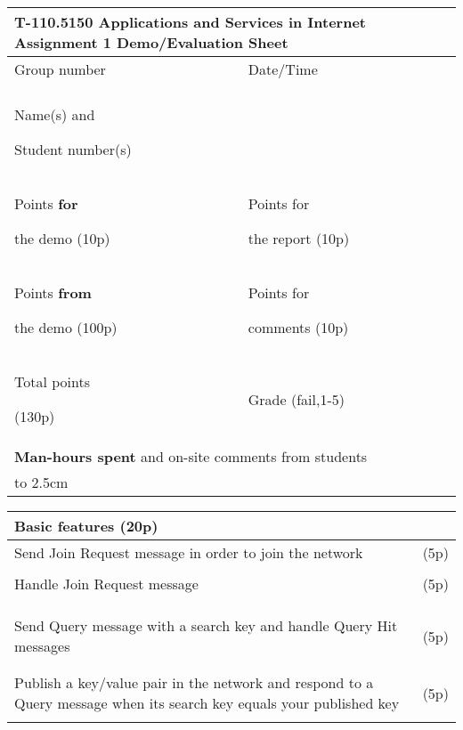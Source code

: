 \documentclass[12pt, a4paper]{article}
\begin{document}
\begin{table}[htdp]
\begin{center}
\begin{tabular}{|p{3.8cm}|p{3.8cm}|p{3.8cm}|p{3.8cm}|}
\multicolumn{4}{l}{T-110.5150 Applications and Services in Internet Assignment 1 Demo/Evaluation Sheet}\\
\hline
Group number & & Date/Time & \\
& & & \\
\hline
Name(s) and\par Student number(s) & \multicolumn{3}{l|}{}\\
\hline
Points \textbf{for}\par the demo (10p)& & Points for\par the report (10p) & \\
\hline
Points \textbf{from}\par the demo (100p)& & Points for\par comments (10p) & \\
\hline
Total points\par (130p) & & Grade (fail,1-5) & \\
\hline
\multicolumn{4}{|l|}{\textbf{Man-hours spent} and on-site comments from students}\\
\hline
\multicolumn{4}{|l|}{\vbox to 2.5cm {}}\\
\hline

\end{tabular}
\end{center}
\end{table}

\begin{table}[htdp]
\begin{center}
\begin{tabular}{|p{6cm}|p{10cm}|}
\multicolumn{2}{l}{Basic features (20p)}\\
\hline
Send Join Request message in order to join the network & (5p) \\
&\\
\hline
Handle Join Request message & (5p)\\
&\\
&\\
&\\
\hline
Send Query message with a search key and handle Query Hit messages & (5p)  \\
&\\
&\\
\hline
Publish a key/value pair in the network and respond to a Query message when its search key equals your published key & (5p) \\
&\\
\hline
\end{tabular}
\end{center}
\end{table}
\end{document}
